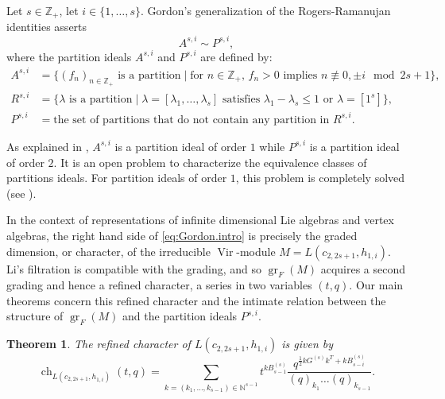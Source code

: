 \documentclass[a4paper, 12pt, reqno]{amsart}
\newtheorem{theorem}{Theorem}[section]
\theoremstyle{remark}
\DeclareMathOperator{\Vir}{Vir}
\DeclareMathOperator{\ch}{ch}
\DeclareMathOperator{\gr}{gr}
\begin{document}
Let $s \in \mathbb{Z}_+$, let $i \in \{1, \dots, s\}$. Gordon's generalization of the Rogers-Ramanujan identities asserts
\begin{equation*}
A^{s, i} \sim P^{s, i},
\end{equation*}
where the partition ideals $A^{s, i}$ and $P^{s, i}$ are defined by:
\begin{align*}
  A^{s, i} &= \{\text{$(f_n)_{n \in \mathbb{Z}_+}$ is a partition} \mid \text{for $n \in \mathbb{Z}_+$, $f_n > 0$ implies $n \not\equiv 0, \pm i \mod 2s + 1$}\}, \\
  R^{s, i} &= \{\text{$\lambda$ is a partition} \mid \text{$\lambda = [\lambda_1, \dots, \lambda_s]$ satisfies $\lambda_1 - \lambda_s \le 1$ or $\lambda = [1^s]$}\}, \\
  P^{s, i} &= \text{the set of partitions that do not contain any partition in $R^{s, i}$}.
\end{align*}


As explained in \cite[\S8]{andrews_theory_1998}, $A^{s, i}$ is a partition ideal of order $1$ while $P^{s, i}$ is a partition ideal of order $2$.
It is an open problem to characterize the equivalence classes of partitions ideals.
For partition ideals of order $1$, this problem is completely solved (see \cite[Theorem 8.4]{andrews_theory_1998}).

In the context of representations of infinite dimensional Lie algebras and vertex algebras, the right hand side of \eqref{eq:Gordon.intro} is precisely the graded dimension, or character, of the irreducible $\Vir$-module $M = L(c_{2, 2s+1}, h_{1, i})$. Li's filtration is compatible with the grading, and so $\gr_F(M)$ acquires a second grading and hence a refined character, a series in two variables $(t, q)$. Our main theorems concern this refined character and the intimate relation between the structure of $\gr_F(M)$ and the partition ideals $P^{s, i}$.
\begin{theorem}
  \label{thr:1}
  The refined character of $L(c_{2, 2s + 1}, h_{1, i})$ is given by
  \begin{equation*}
    \ch_{L(c_{2, 2s + 1}, h_{1, i})}(t, q) = %
    \sum_{k = (k_1, \dots, k_{s - 1}) \in \mathbb{N}^{s - 1}}t^{kB^{(s)}_{s - 1}}\frac{q^{\frac{1}{2}kG^{(s)}k^T + kB^{(s)}_{s - i}}}{(q)_{k_1}\dots(q)_{k_{s - 1}}}.
  \end{equation*}
\end{theorem}
\end{document}
